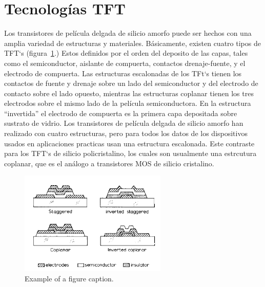 \documentclass[conference]{IEEEtran}
\begin{document}
\section{Tecnologías TFT}
    Los transistores de película delgada de silicio amorfo puede ser hechos con una amplia
    variedad de estructuras y materiales. Básicamente, existen cuatro tipos
    de TFT`s (figura~\ref{fig1}.) Estos definidos por el orden del deposito de las capas, tales como el semiconductor,
    aislante de compuerta, contactos drenaje-fuente, y el electrodo de
    compuerta. Las estructuras escalonadas de los TFt`s tienen los contactos de fuente y drenaje
    sobre un lado del semiconductor y del electrodo de contacto sobre el lado opuesto,
    mientras las estructuras coplanar tienen los tres electrodos sobre
    el mismo lado de la película semiconductora. En la estructura ``invertida'' el
    electrodo de compuerta es la primera capa depositada sobre sustrato de vidrio.
    Los transistores de película delgada de silicio amorfo han realizado con cuatro estructuras,
    pero para todos los datos de los dispositivos usados en aplicaciones
    practicas usan una estructura escalonada. Este contraste para los TFT`s de silicio
    policristalino, los cuales son usualmente una estrcutura coplanar, que es el análogo 
    a transistores MOS de silicio cristalino.

\begin{figure}[htbp]
    \centerline{\includegraphics[width=7cm]{img/imagen-1.png}}
    \caption{Example of a figure caption.}%
    \label{fig1}
\end{figure}
\end{document}
